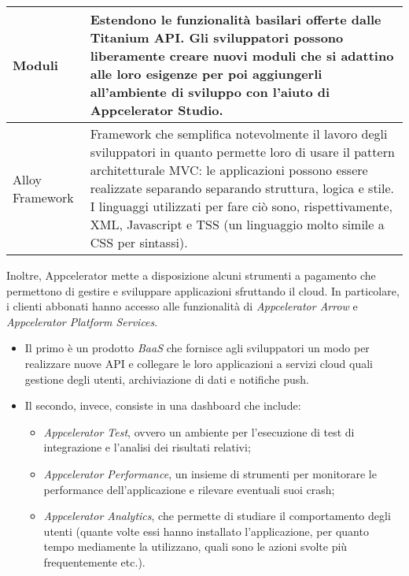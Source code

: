 				\begin{center}
					\begin{tabular}[H]{p{} p{}}
						Moduli				& Estendono le funzionalità basilari offerte dalle Titanium API. Gli
										  sviluppatori possono liberamente creare nuovi moduli che si
										  adattino alle loro esigenze per poi aggiungerli all'ambiente di
										  sviluppo con l'aiuto di Appcelerator Studio.\\
						\hline
						Alloy Framework			& Framework che semplifica notevolmente il lavoro degli sviluppatori
										  in quanto permette loro di usare il pattern architetturale MVC: le
										  applicazioni possono essere realizzate separando separando
										  struttura, logica e stile. I linguaggi utilizzati per fare ciò
										  sono, rispettivamente, XML, Javascript e TSS (un linguaggio molto
										  simile a CSS per sintassi).\\
					\end{tabular}
				\end{center}
				Inoltre, Appcelerator mette a disposizione alcuni strumenti a pagamento che permettono di gestire e sviluppare
				applicazioni sfruttando il cloud. In particolare, i clienti abbonati hanno accesso alle funzionalità di
				\emph{Appcelerator Arrow} e \emph{Appcelerator Platform Services}.
				\begin{itemize}
					\item Il primo è un prodotto \emph{BaaS} che fornisce agli sviluppatori un modo per realizzare nuove API e
					collegare le loro applicazioni a servizi cloud quali gestione degli utenti, archiviazione di dati e
					notifiche push.
					\item Il secondo, invece, consiste in una dashboard che include:
					\begin{itemize}
						\item \emph{Appcelerator Test}, ovvero un ambiente per l'esecuzione di test di integrazione e
						l'analisi dei risultati relativi;
						\item \emph{Appcelerator Performance}, un insieme di strumenti per monitorare le performance
						dell'applicazione e rilevare eventuali suoi crash;
						\item \emph{Appcelerator Analytics}, che permette di studiare il comportamento degli utenti (quante
						volte essi hanno installato l'applicazione, per quanto tempo mediamente la utilizzano, quali sono
						le azioni svolte più frequentemente etc.).
					\end{itemize}
				\end{itemize}
